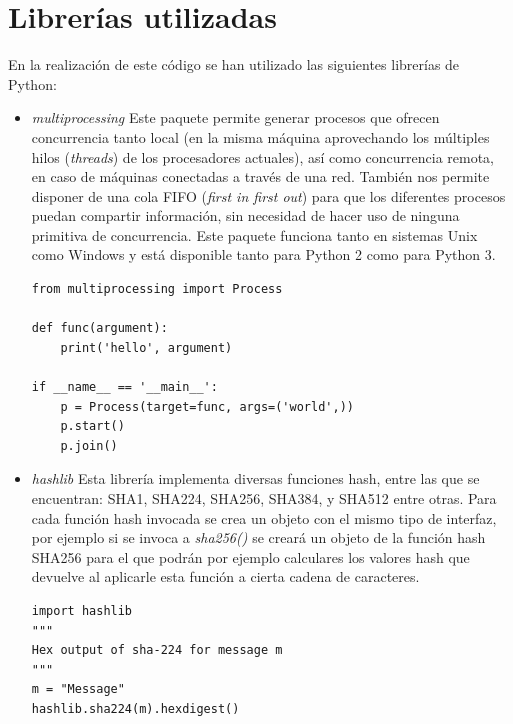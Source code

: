 \section{Librerías utilizadas}
En la realización de este código se han utilizado las siguientes librerías de Python:
\begin{itemize}
\item \textit{multiprocessing}\cite{multiprocessing} Este paquete permite generar procesos que ofrecen concurrencia tanto local (en la misma máquina aprovechando los múltiples hilos (\textit{threads}) de los procesadores actuales), así como concurrencia remota, en caso de máquinas conectadas a través de una red.
También nos permite disponer de una cola FIFO (\textit{first in first out}) para que los diferentes procesos puedan compartir información, sin necesidad de hacer uso de ninguna primitiva de concurrencia. Este paquete funciona tanto en sistemas Unix como Windows y está disponible tanto para Python 2 como para Python 3.



\lstset{language=Python}
\lstset{frame=lines}
\lstset{basicstyle=\footnotesize}
\begin{lstlisting}[title=Generación de nuevos procesos]
from multiprocessing import Process

def func(argument):
    print('hello', argument)

if __name__ == '__main__':
    p = Process(target=func, args=('world',))
    p.start()
    p.join()
\end{lstlisting}

\item \textit{hashlib} \cite{hashlib} Esta librería implementa diversas funciones hash, entre las que se encuentran: SHA1, SHA224, SHA256, SHA384, y SHA512 entre otras. Para cada función hash invocada se crea un objeto con el mismo tipo de interfaz, por ejemplo si se invoca a \textit{sha256()} se creará un objeto de la función hash SHA256 para el que podrán por ejemplo calculares los valores hash que devuelve al aplicarle esta función a cierta cadena de caracteres.

\lstset{language=Python}
\lstset{frame=lines}
\lstset{basicstyle=\footnotesize}
\begin{lstlisting}[title=Hashlib]
import hashlib
"""
Hex output of sha-224 for message m
"""
m = "Message"
hashlib.sha224(m).hexdigest()
\end{lstlisting}


\end{itemize}
